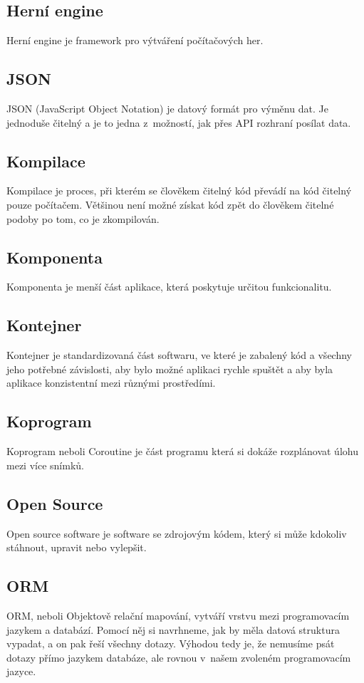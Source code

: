 \subsection{Herní engine}
Herní engine je framework pro výtváření počítačových her.

\subsection{JSON}
JSON (JavaScript Object Notation) je datový formát pro výměnu dat. Je jednoduše čitelný a je to jedna z~možností, jak přes API rozhraní posílat data. \cite{JSON}

\subsection{Kompilace}
Kompilace je proces, při kterém se člověkem čitelný kód převádí na kód čitelný pouze počítačem. Většinou není možné získat kód zpět do člověkem čitelné podoby po tom, co je zkompilován.

\subsection{Komponenta}
Komponenta je menší část aplikace, která poskytuje určitou funkcionalitu.

\subsection{Kontejner}
Kontejner je standardizovaná část softwaru, ve které je zabalený kód a všechny jeho potřebné závislosti, aby bylo možné aplikaci rychle spuštět a aby byla aplikace konzistentní mezi různými prostředími. \cite{Kontejner}

\subsection{Koprogram}
Koprogram neboli Coroutine je část programu která si dokáže rozplánovat úlohu mezi více snímků.\cite{Coroutine} 

\subsection{Open Source}
Open source software je software se zdrojovým kódem, který si může kdokoliv stáhnout, upravit nebo vylepšit. \cite{OpenSource}

\subsection{ORM}
ORM, neboli Objektově relační mapování, vytváří vrstvu mezi programovacím jazykem a databází. Pomocí něj si navrhneme, jak by měla datová struktura vypadat, a on pak řeší všechny dotazy. Výhodou tedy je, že nemusíme psát dotazy přímo jazykem databáze, ale rovnou v~našem zvoleném programovacím jazyce.

